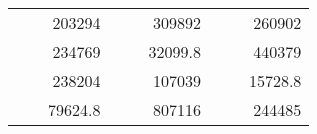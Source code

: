 \begin{table}[H]
\begin{tabular}{|ccrccrccc}
\rowcolor[HTML]{DAE8FC} 
\multicolumn{1}{|c|}{\cellcolor[HTML]{FFFFC7}}                                & \multicolumn{1}{c|}{\cellcolor[HTML]{DAE8FC}}                      & \multicolumn{1}{r|}{\cellcolor[HTML]{DAE8FC}203294}    & \multicolumn{1}{c|}{\cellcolor[HTML]{FFFFC7}}                                & \multicolumn{1}{c|}{\cellcolor[HTML]{DAE8FC}}                       & \multicolumn{1}{r|}{\cellcolor[HTML]{DAE8FC}309892}    & \multicolumn{1}{c|}{\cellcolor[HTML]{FFFFC7}}                                & \multicolumn{1}{c|}{\cellcolor[HTML]{DAE8FC}}                      & \multicolumn{1}{r|}{\cellcolor[HTML]{DAE8FC}260902}    \\ \cline{3-3} \cline{6-6} \cline{9-9} 
\multicolumn{1}{|c|}{\cellcolor[HTML]{FFFFC7}}                                & \multicolumn{1}{c|}{\cellcolor[HTML]{DAE8FC}}                      & \multicolumn{1}{r|}{\cellcolor[HTML]{DDFDFF}234769}    & \multicolumn{1}{c|}{\cellcolor[HTML]{FFFFC7}}                                & \multicolumn{1}{c|}{\cellcolor[HTML]{DAE8FC}}                       & \multicolumn{1}{r|}{\cellcolor[HTML]{DDFDFF}32099.8}   & \multicolumn{1}{c|}{\cellcolor[HTML]{FFFFC7}}                                & \multicolumn{1}{c|}{\cellcolor[HTML]{DAE8FC}}                      & \multicolumn{1}{r|}{\cellcolor[HTML]{DDFDFF}440379}    \\ \cline{3-3} \cline{6-6} \cline{9-9} 
\rowcolor[HTML]{DAE8FC} 
\multicolumn{1}{|c|}{\cellcolor[HTML]{FFFFC7}}                                & \multicolumn{1}{c|}{\cellcolor[HTML]{DAE8FC}}                      & \multicolumn{1}{r|}{\cellcolor[HTML]{DAE8FC}238204}    & \multicolumn{1}{c|}{\cellcolor[HTML]{FFFFC7}}                                & \multicolumn{1}{c|}{\cellcolor[HTML]{DAE8FC}}                       & \multicolumn{1}{r|}{\cellcolor[HTML]{DAE8FC}107039}    & \multicolumn{1}{c|}{\cellcolor[HTML]{FFFFC7}}                                & \multicolumn{1}{c|}{\cellcolor[HTML]{DAE8FC}}                      & \multicolumn{1}{r|}{\cellcolor[HTML]{DAE8FC}15728.8}   \\ \cline{3-3} \cline{6-6} \cline{9-9} 
\multicolumn{1}{|c|}{\cellcolor[HTML]{FFFFC7}}                                & \multicolumn{1}{c|}{\cellcolor[HTML]{DAE8FC}}                      & \multicolumn{1}{r|}{\cellcolor[HTML]{DDFDFF}79624.8}   & \multicolumn{1}{c|}{\cellcolor[HTML]{FFFFC7}}                                & \multicolumn{1}{c|}{\cellcolor[HTML]{DAE8FC}}                       & \multicolumn{1}{r|}{\cellcolor[HTML]{DDFDFF}807116}    & \multicolumn{1}{c|}{\cellcolor[HTML]{FFFFC7}}                                & \multicolumn{1}{c|}{\cellcolor[HTML]{DAE8FC}}                      & \multicolumn{1}{r|}{\cellcolor[HTML]{DDFDFF}244485}    \\ \cline{3-3} \cline{6-6} \cline{9-9} 

\end{tabular}
\end{table}
